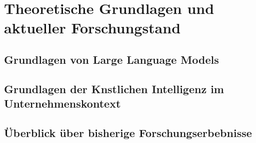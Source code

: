 \chapter{Theoretische Grundlagen und aktueller Forschungstand}

\section{Grundlagen von Large Language Models}

\section{Grundlagen der Knstlichen Intelligenz im Unternehmenskontext}

\section{Überblick über bisherige Forschungserbebnisse}